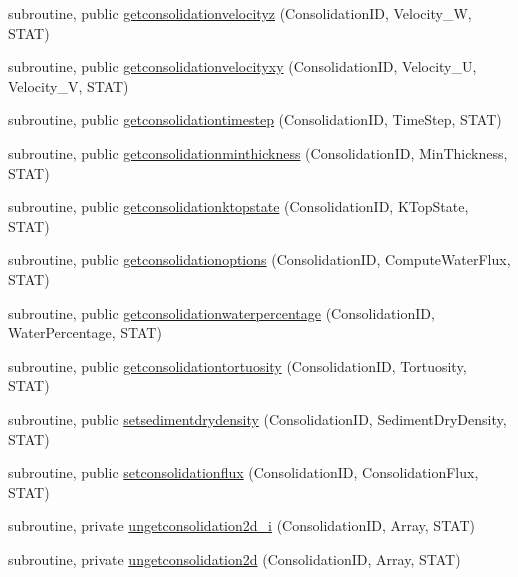 \begin{DoxyCompactItemize}
subroutine, public \mbox{\hyperlink{namespacemoduleconsolidation_a1a8c6ae3e68c283ceaaa0a81fb8f531b}{getconsolidationvelocityz}} (Consolidation\+ID, Velocity\+\_\+W, S\+T\+AT)
\item 
subroutine, public \mbox{\hyperlink{namespacemoduleconsolidation_ad474911e58923dc9beb19e05548a5073}{getconsolidationvelocityxy}} (Consolidation\+ID, Velocity\+\_\+U, Velocity\+\_\+V, S\+T\+AT)
\item 
subroutine, public \mbox{\hyperlink{namespacemoduleconsolidation_a529ccec5bab61ec53a0993230d6bb49c}{getconsolidationtimestep}} (Consolidation\+ID, Time\+Step, S\+T\+AT)
\item 
subroutine, public \mbox{\hyperlink{namespacemoduleconsolidation_a9166ecea6df370e3decee58c70761e72}{getconsolidationminthickness}} (Consolidation\+ID, Min\+Thickness, S\+T\+AT)
\item 
subroutine, public \mbox{\hyperlink{namespacemoduleconsolidation_ace4ba590047f774affd5abf5e15b7e41}{getconsolidationktopstate}} (Consolidation\+ID, K\+Top\+State, S\+T\+AT)
\item 
subroutine, public \mbox{\hyperlink{namespacemoduleconsolidation_a37aecd6313d74a8d082f6b77cd63bfef}{getconsolidationoptions}} (Consolidation\+ID, Compute\+Water\+Flux, S\+T\+AT)
\item 
subroutine, public \mbox{\hyperlink{namespacemoduleconsolidation_ab90e8e4b9e87d2f8313a0f2860b3d4c8}{getconsolidationwaterpercentage}} (Consolidation\+ID, Water\+Percentage, S\+T\+AT)
\item 
subroutine, public \mbox{\hyperlink{namespacemoduleconsolidation_a6f6333d1cd3299be92039f6e03e3b5b8}{getconsolidationtortuosity}} (Consolidation\+ID, Tortuosity, S\+T\+AT)
\item 
subroutine, public \mbox{\hyperlink{namespacemoduleconsolidation_a79a5986057fbc83932d56bb8bfcf6b3b}{setsedimentdrydensity}} (Consolidation\+ID, Sediment\+Dry\+Density, S\+T\+AT)
\item 
subroutine, public \mbox{\hyperlink{namespacemoduleconsolidation_a40ac455c6e9cb9d5dfa436553c29c193}{setconsolidationflux}} (Consolidation\+ID, Consolidation\+Flux, S\+T\+AT)
\item 
subroutine, private \mbox{\hyperlink{namespacemoduleconsolidation_aeceaae1f01485ce743c8347e2a73399e}{ungetconsolidation2d\+\_\+i}} (Consolidation\+ID, Array, S\+T\+AT)
\item 
subroutine, private \mbox{\hyperlink{namespacemoduleconsolidation_a9e7318abc8bb17ca00bd720c8eff021f}{ungetconsolidation2d}} (Consolidation\+ID, Array, S\+T\+AT)

\end{DoxyCompactItemize}
